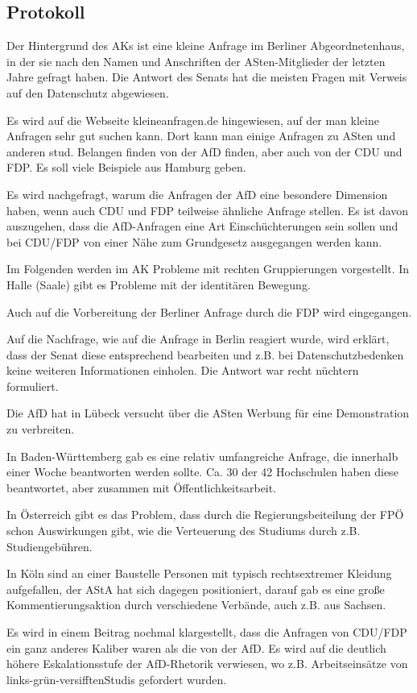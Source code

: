   \subsection*{Protokoll}
Der Hintergrund des AKs ist eine kleine Anfrage im Berliner Abgeordnetenhaus, in der sie nach den Namen und Anschriften der ASten-Mitglieder der letzten Jahre gefragt haben. Die Antwort des Senats hat die meisten Fragen mit Verweis auf den Datenschutz abgewiesen.

Es wird auf die Webseite kleineanfragen.de hingewiesen, auf der man kleine Anfragen sehr gut suchen kann. Dort kann man einige Anfragen zu ASten und anderen stud. Belangen finden von der AfD finden, aber auch von der CDU und FDP. Es soll viele Beispiele aus Hamburg geben. 

Es wird nachgefragt, warum die Anfragen der AfD eine besondere Dimension haben, wenn auch CDU und FDP teilweise ähnliche Anfrage stellen. Es ist davon auszugehen, dass die AfD-Anfragen eine Art Einschüchterungen sein sollen und bei CDU/FDP von einer Nähe zum Grundgesetz ausgegangen werden kann. 

Im Folgenden werden im AK Probleme mit rechten Gruppierungen vorgestellt. 
In Halle (Saale) gibt es Probleme mit der identitären Bewegung. 

Auch auf die Vorbereitung der Berliner Anfrage durch die FDP wird eingegangen. 

Auf die Nachfrage, wie auf die Anfrage in Berlin reagiert wurde, wird erklärt, dass der Senat diese entsprechend bearbeiten und z.B. bei Datenschutzbedenken keine weiteren Informationen einholen. Die Antwort war recht nüchtern formuliert. 

Die AfD hat in Lübeck versucht über die ASten Werbung für eine Demonstration zu verbreiten. 

In Baden-Württemberg gab es eine relativ umfangreiche Anfrage, die innerhalb einer Woche beantworten werden sollte. Ca. 30 der 42 Hochschulen haben diese beantwortet, aber zusammen mit Öffentlichkeitsarbeit. 

In Österreich gibt es das Problem, dass durch die Regierungsbeiteilung der FPÖ schon Auswirkungen gibt, wie die Verteuerung des Studiums durch z.B. Studiengebühren. 

In Köln sind an einer Baustelle Personen mit typisch rechtsextremer Kleidung aufgefallen, der AStA hat sich dagegen positioniert, darauf gab es eine große Kommentierungsaktion durch verschiedene Verbände, auch z.B. aus Sachsen.

Es wird in einem Beitrag nochmal klargestellt, dass die Anfragen von CDU/FDP ein ganz anderes Kaliber waren als die von der AfD. Es wird auf die deutlich höhere Eskalationsstufe der AfD-Rhetorik verwiesen, wo z.B. Arbeitseinsätze von \flqq links-grün-versifften\frqq Studis gefordert wurden. 

